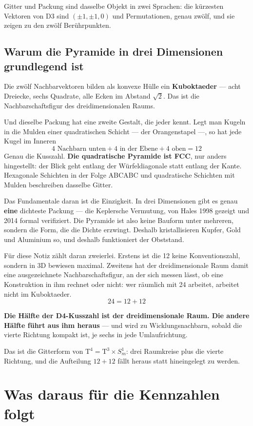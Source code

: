 \documentclass[11pt]{report}
\begin{document}
Gitter und Packung sind dasselbe Objekt in zwei Sprachen: die kürzesten
Vektoren von D3 sind $(\pm1, \pm1, 0)$ und Permutationen, genau zwölf,
und sie zeigen zu den zwölf Berührpunkten.

\section{Warum die Pyramide in drei Dimensionen grundlegend ist}

Die zwölf Nachbarvektoren bilden als konvexe Hülle ein
\textbf{Kuboktaeder} --- acht Dreiecke, sechs Quadrate, alle Ecken im
Abstand $\sqrt2$. Das ist die Nachbarschaftsfigur des dreidimensionalen
Raums.

Und dieselbe Packung hat eine zweite Gestalt, die jeder kennt. Legt man
Kugeln in die Mulden einer quadratischen Schicht --- der Orangenstapel
---, so hat jede Kugel im Inneren
\[
  4 \text{ Nachbarn unten} + 4 \text{ in der Ebene}
  + 4 \text{ oben} = 12
\]
Genau die Kusszahl. \textbf{Die quadratische Pyramide ist FCC}, nur
anders hingestellt: der Blick geht entlang der Würfeldiagonale statt
entlang der Kante. Hexagonale Schichten in der Folge ABCABC und
quadratische Schichten mit Mulden beschreiben dasselbe Gitter.

Das Fundamentale daran ist die Einzigkeit. In drei Dimensionen gibt es
genau \textbf{eine} dichteste Packung --- die Keplersche Vermutung, von
Hales 1998 gezeigt und 2014 formal verifiziert. Die Pyramide ist also
keine Bauform unter mehreren, sondern die Form, die die Dichte
erzwingt. Deshalb kristallisieren Kupfer, Gold und Aluminium so, und
deshalb funktioniert der Obststand.

Für diese Notiz zählt daran zweierlei. Erstens ist die 12 keine
Konventionszahl, sondern in 3D bewiesen maximal. Zweitens hat der
dreidimensionale Raum damit eine ausgezeichnete Nachbarschaftsfigur, an
der sich messen lässt, ob eine Konstruktion in ihm rechnet oder nicht:
wer räumlich mit 24 arbeitet, arbeitet nicht im Kuboktaeder.
\[
  24 = 12 + 12
\]

\textbf{Die Hälfte der D4-Kusszahl ist der dreidimensionale Raum. Die
andere Hälfte führt aus ihm heraus} --- und wird zu Wicklungsnachbarn,
sobald die vierte Richtung kompakt ist, je sechs in jede
Umlaufrichtung.

Das ist die Gitterform von
$\text{T}^4 = \text{T}^3 \times S^1_m$: drei Raumkreise plus die
vierte Richtung, und die Aufteilung $12 + 12$ fällt heraus statt
hineingelegt zu werden.

\chapter{Was daraus für die Kennzahlen folgt}
\end{document}
